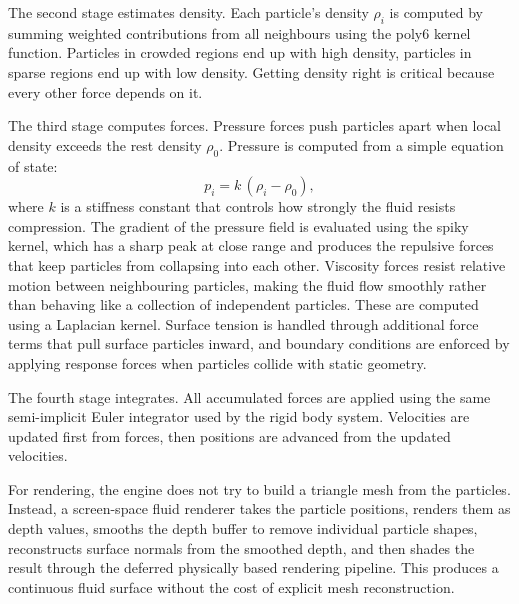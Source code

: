 \documentclass[9pt,openany]{extbook}
\begin{document}
The second stage estimates density. Each particle's density $\rho_i$ is computed by summing weighted contributions from all neighbours using the poly6 kernel function. Particles in crowded regions end up with high density, particles in sparse regions end up with low density. Getting density right is critical because every other force depends on it.

The third stage computes forces. Pressure forces push particles apart when local density exceeds the rest density $\rho_0$. Pressure is computed from a simple equation of state:
\[
  p_i = k\,(\rho_i - \rho_0),
\]
where $k$ is a stiffness constant that controls how strongly the fluid resists compression. The gradient of the pressure field is evaluated using the spiky kernel, which has a sharp peak at close range and produces the repulsive forces that keep particles from collapsing into each other. Viscosity forces resist relative motion between neighbouring particles, making the fluid flow smoothly rather than behaving like a collection of independent particles. These are computed using a Laplacian kernel. Surface tension is handled through additional force terms that pull surface particles inward, and boundary conditions are enforced by applying response forces when particles collide with static geometry.

The fourth stage integrates. All accumulated forces are applied using the same semi-implicit Euler integrator used by the rigid body system. Velocities are updated first from forces, then positions are advanced from the updated velocities.

For rendering, the engine does not try to build a triangle mesh from the particles. Instead, a screen-space fluid renderer takes the particle positions, renders them as depth values, smooths the depth buffer to remove individual particle shapes, reconstructs surface normals from the smoothed depth, and then shades the result through the deferred physically based rendering pipeline. This produces a continuous fluid surface without the cost of explicit mesh reconstruction.
\end{document}
